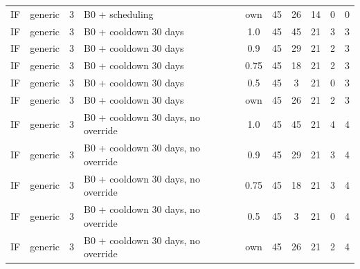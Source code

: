 \begin{longtable}{lllp{4.4cm}cccccc}
IF & generic & 3 & B0 + scheduling & own & 45 & 26 & 14 & 0 & 0 \\
IF & generic & 3 & B0 + cooldown 30 days & 1.0 & 45 & 45 & 21 & 3 & 3 \\
IF & generic & 3 & B0 + cooldown 30 days & 0.9 & 45 & 29 & 21 & 2 & 3 \\
IF & generic & 3 & B0 + cooldown 30 days & 0.75 & 45 & 18 & 21 & 2 & 3 \\
IF & generic & 3 & B0 + cooldown 30 days & 0.5 & 45 & 3 & 21 & 0 & 3 \\
IF & generic & 3 & B0 + cooldown 30 days & own & 45 & 26 & 21 & 2 & 3 \\
IF & generic & 3 & B0 + cooldown 30 days, no override & 1.0 & 45 & 45 & 21 & 4 & 4 \\
IF & generic & 3 & B0 + cooldown 30 days, no override & 0.9 & 45 & 29 & 21 & 3 & 4 \\
IF & generic & 3 & B0 + cooldown 30 days, no override & 0.75 & 45 & 18 & 21 & 3 & 4 \\
IF & generic & 3 & B0 + cooldown 30 days, no override & 0.5 & 45 & 3 & 21 & 0 & 4 \\
IF & generic & 3 & B0 + cooldown 30 days, no override & own & 45 & 26 & 21 & 2 & 4 \\
\bottomrule
\end{longtable}

